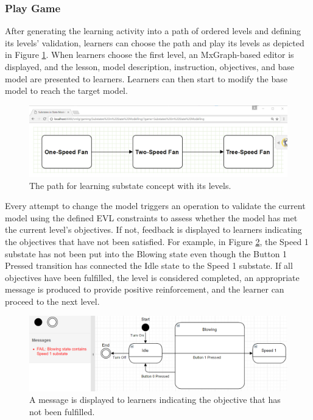 \documentclass[10pt, a4paper]{report} \usepackage[titletoc]{appendix}
\begin{document}
\subsubsection{Play Game}
After generating the learning activity into a path of ordered levels and defining its levels' validation, learners can choose the path and play its levels as depicted in Figure \ref{path}. When learners choose the first level, an MxGraph-based editor is displayed, and the lesson, model description, instruction, objectives, and base model are presented to learners. Learners can then start to modify the base model to reach the target model. 

\begin{figure}[t!]
\centering
\includegraphics[width=12cm]{path}
\caption{The path for learning substate concept with its levels.}
\label{path}
\end{figure} 

Every attempt to change the model triggers an operation to validate the current model using the defined EVL constraints to assess whether the model has met the current level's objectives. If not, feedback is displayed to learners indicating the objectives that have not been satisfied. For example, in Figure \ref{example-fail-messages}, the Speed 1 substate has not been put into the Blowing state even though the Button 1 Pressed transition has connected the Idle state to the Speed 1 substate. If all objectives have been fulfilled, the level is considered completed, an appropriate message is produced to provide positive reinforcement, and the learner can proceed to the next level. 

\begin{figure}[t!]
\centering
\includegraphics[width=12cm]{example-fail-messages}
\caption{A message is displayed to learners indicating the objective that has not been fulfilled.}
\label{example-fail-messages}
\end{figure} 
\end{document}
